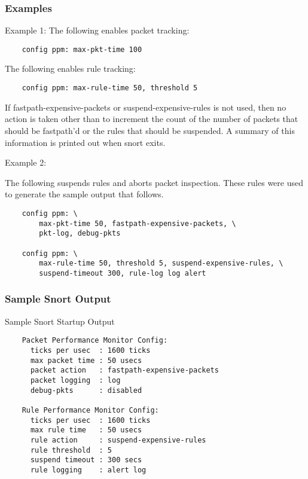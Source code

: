 \documentclass[english]{report}
\begin{document}
\subsubsection{Examples}

Example 1:
The following enables packet tracking:

\begin{verbatim}
    config ppm: max-pkt-time 100
\end{verbatim}

The following enables rule tracking:

\begin{verbatim}
    config ppm: max-rule-time 50, threshold 5
\end{verbatim}

If fastpath-expensive-packets or suspend-expensive-rules is not used, then
no action is taken other than to increment the count of the number of
packets that should be fastpath'd or the rules that should be suspended. A
summary of this information is printed out when snort exits.

Example 2:

The following suspends rules and aborts packet inspection.  These rules were
used to generate the sample output that follows.

\begin{verbatim}
    config ppm: \
        max-pkt-time 50, fastpath-expensive-packets, \
        pkt-log, debug-pkts
    
    config ppm: \
        max-rule-time 50, threshold 5, suspend-expensive-rules, \
        suspend-timeout 300, rule-log log alert
\end{verbatim}

\subsubsection{Sample Snort Output}

Sample Snort Startup Output

\begin{verbatim}
    Packet Performance Monitor Config:
      ticks per usec  : 1600 ticks
      max packet time : 50 usecs
      packet action   : fastpath-expensive-packets
      packet logging  : log
      debug-pkts      : disabled
    
    Rule Performance Monitor Config:
      ticks per usec  : 1600 ticks
      max rule time   : 50 usecs
      rule action     : suspend-expensive-rules
      rule threshold  : 5 
      suspend timeout : 300 secs
      rule logging    : alert log 
\end{verbatim}
\end{document}
